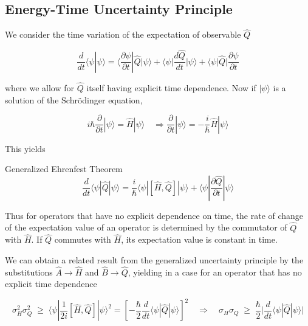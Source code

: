 \subsection{Energy-Time Uncertainty Principle} 

We consider the time variation of the expectation of observable $\hat{Q}$ 

\[
\frac{d }{d t} \langle \psi |\psi\rangle = \langle \frac{\partial
\psi}{\partial t} | \hat{Q} | \psi \rangle + \langle \psi | \frac{d \hat{Q}}{d
t} | \psi \rangle + \langle \psi | \hat{Q} | \frac{\partial \psi}{\partial t} 
\] \vspace{3px}

where we allow for $\hat{Q}$ itself having explicit time dependence. Now if
$|\psi\rangle$ is a solution of the Schr\"odinger equation, 

\[
i\hbar \frac{\partial }{\partial t} |\psi \rangle = \hat{H}|\psi\rangle \quad
\Rightarrow \frac{\partial }{\partial t} |\psi\rangle = -\frac{i}{\hbar}
\hat{H} |\psi \rangle
\] \vspace{3px}

This yields

\begin{subbox}{Generalized Ehrenfest Theorem}
  \[
  \frac{d }{d t} \langle \psi | \hat{Q} | \psi \rangle = \frac{i}{\hbar}
  \langle \psi | [\hat{H}, \hat{Q}]| \psi \rangle + \langle \psi
  | \frac{\partial \hat{Q}}{\partial t} | \psi \rangle
  \] \vspace{3px}
\end{subbox}


Thus for operators that have no explicit dependence on time, the rate of change
of the expectation value of an operator is determined by the commutator of
$\hat{Q}$ with $\hat{H}$. If $\hat{Q}$ commutes with $\hat{H}$, its expectation
value is constant in time. 

We can obtain a related result from the generalized uncertainty principle by
the substitutions $\hat{A} \rightarrow \hat{H}$ and $\hat{B} \rightarrow
\hat{Q}$, yielding in a case for an operator that has no explicit time
dependence 

\[
\sigma^2_H\sigma_Q^2 \; \geq \; \langle \psi | \frac{1}{2i} \left[ \hat{H},
\hat{Q}\right]| \psi \rangle^2 = \left[ -\frac{\hbar}{2} \frac{d }{d t} \langle
\psi | \hat{Q} | \psi \rangle \right]^2 \quad \Rightarrow \quad \sigma_H
\sigma_Q \; \geq \; \frac{\hbar}{2} \Bigg| \frac{d }{d t} \langle \psi
| \hat{Q} | \psi \rangle \Bigg|
\] \vspace{3px}


